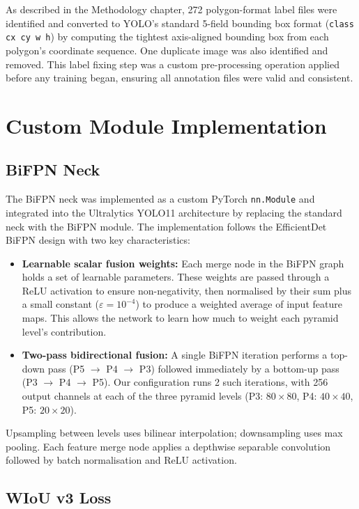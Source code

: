 As described in the Methodology chapter, 272 polygon-format label files were identified and converted to YOLO's standard 5-field bounding box format (\texttt{class cx cy w h}) by computing the tightest axis-aligned bounding box from each polygon's coordinate sequence. One duplicate image was also identified and removed. This label fixing step was a custom pre-processing operation applied before any training began, ensuring all annotation files were valid and consistent.

\section{Custom Module Implementation}

\subsection{BiFPN Neck}

The BiFPN neck was implemented as a custom PyTorch \texttt{nn.Module} and integrated into the Ultralytics YOLO11 architecture by replacing the standard neck with the BiFPN module. The implementation follows the EfficientDet BiFPN design with two key characteristics:

\begin{itemize}
    \item \textbf{Learnable scalar fusion weights:} Each merge node in the BiFPN graph holds a set of learnable parameters. These weights are passed through a ReLU activation to ensure non-negativity, then normalised by their sum plus a small constant ($\varepsilon = 10^{-4}$) to produce a weighted average of input feature maps. This allows the network to learn how much to weight each pyramid level's contribution.
    \item \textbf{Two-pass bidirectional fusion:} A single BiFPN iteration performs a top-down pass (P5 $\rightarrow$ P4 $\rightarrow$ P3) followed immediately by a bottom-up pass (P3 $\rightarrow$ P4 $\rightarrow$ P5). Our configuration runs 2 such iterations, with 256 output channels at each of the three pyramid levels (P3: $80\!\times\!80$, P4: $40\!\times\!40$, P5: $20\!\times\!20$).
\end{itemize}

Upsampling between levels uses bilinear interpolation; downsampling uses max pooling. Each feature merge node applies a depthwise separable convolution followed by batch normalisation and ReLU activation.

\subsection{WIoU v3 Loss}

